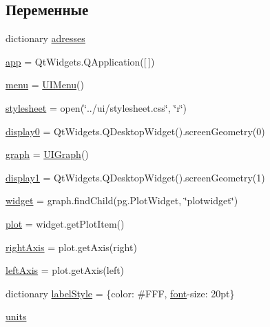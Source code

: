 \subsection*{Переменные}
\begin{DoxyCompactItemize}
\item 
dictionary \hyperlink{namespaceui_aad45a9db615017fdd003dcd9e271a9b9}{adresses}
\item 
\hyperlink{namespaceui_aa319e24d35c85648c0d34ea8d6c77912}{app} = Qt\+Widgets.\+Q\+Application(\mbox{[}$\,$\mbox{]})
\item 
\hyperlink{namespaceui_a4852f8d0ec72ef9b0220e692e9c1d362}{menu} = \hyperlink{classui_1_1_u_i_menu}{U\+I\+Menu}()
\item 
\hyperlink{namespaceui_a622dff979fe009d0b7a0b5065a48eeb4}{stylesheet} = open(\char`\"{}../ui/stylesheet.\+css\char`\"{}, \char`\"{}r\char`\"{})
\item 
\hyperlink{namespaceui_a67d6f2ec81b00e7991565662f9e946f7}{display0} = Qt\+Widgets.\+Q\+Desktop\+Widget().screen\+Geometry(0)
\item 
\hyperlink{namespaceui_a0b8ac4e4d4aa6108a23039c53766f6f1}{graph} = \hyperlink{classui_1_1_u_i_graph}{U\+I\+Graph}()
\item 
\hyperlink{namespaceui_afb5a8d9a573e872a43b870282effe261}{display1} = Qt\+Widgets.\+Q\+Desktop\+Widget().screen\+Geometry(1)
\item 
\hyperlink{namespaceui_a7ddac767c5071a1d37d729710165cdd4}{widget} = graph.\+find\+Child(pg.\+Plot\+Widget, \char`\"{}plotwidget\char`\"{})
\item 
\hyperlink{namespaceui_a45f8c2fae5eb64cd2de3091bd3fc3ca8}{plot} = widget.\+get\+Plot\+Item()
\item 
\hyperlink{namespaceui_a0f719593f62467929abfbb1db46530a9}{right\+Axis} = plot.\+get\+Axis(\textquotesingle{}right\textquotesingle{})
\item 
\hyperlink{namespaceui_a253eda5cb3ca4d465c03c0efdcd850cd}{left\+Axis} = plot.\+get\+Axis(\textquotesingle{}left\textquotesingle{})
\item 
dictionary \hyperlink{namespaceui_abb44f579230c8104a085647cbfd74b4e}{label\+Style} = \{\textquotesingle{}color\textquotesingle{}\+: \textquotesingle{}\#F\+FF\textquotesingle{}, \textquotesingle{}\hyperlink{namespaceui_a30ed37eb10260adbcf97ae9f39bc5f8e}{font}-\/size\textquotesingle{}\+: \textquotesingle{}20pt\textquotesingle{}\}
\item 
\hyperlink{namespaceui_ae4eb85d01779e3357581532c19e8f6c9}{units}
\item 

\end{DoxyCompactItemize}
